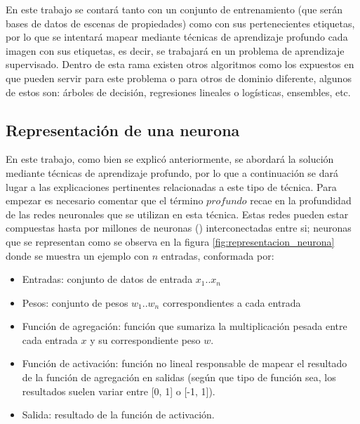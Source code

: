  En este trabajo se contará tanto con un conjunto de entrenamiento (que serán bases de datos de escenas de propiedades) como con sus pertenecientes etiquetas, por lo que se intentará mapear mediante técnicas de aprendizaje profundo cada imagen con sus etiquetas, es decir, se trabajará en un problema de aprendizaje supervisado. Dentro de esta rama existen otros algoritmos como los expuestos en \cite{scikit-learn} que pueden servir para este problema o para otros de dominio diferente, algunos de estos son: árboles de decisión, regresiones lineales o logísticas, ensembles, etc.
 
\subsection{Representación de una neurona}

 En este trabajo, como bien se explicó anteriormente, se abordará la solución mediante técnicas de aprendizaje profundo, por lo que a continuación se dará lugar a las explicaciones pertinentes relacionadas a este tipo de técnica.
 Para empezar es necesario comentar que el término \(profundo\) recae en la profundidad de las redes neuronales que se utilizan en esta técnica. Estas redes pueden estar compuestas hasta por millones de neuronas (\cite{mcculloch1943logical}) interconectadas entre si; neuronas que se representan como se observa en la figura \ref{fig:representacion_neurona} donde se muestra un ejemplo con \(n\) entradas, conformada por: 
 \begin{itemize}
 	\item Entradas: conjunto de datos de entrada \(x_1\)..\(x_n\)
 	\item Pesos: conjunto de pesos \(w_1\)..\(w_n\) correspondientes a cada entrada
 	\item Función de agregación: función que sumariza la multiplicación pesada entre cada entrada \(x\) y su correspondiente peso \(w\).
	\item Función de activación: función no lineal responsable de mapear el resultado de la función de agregación en salidas (según que tipo de función sea, los resultados suelen variar entre [0, 1] o [-1, 1]).
	\item Salida: resultado de la función de activación.
 \end{itemize}
 
